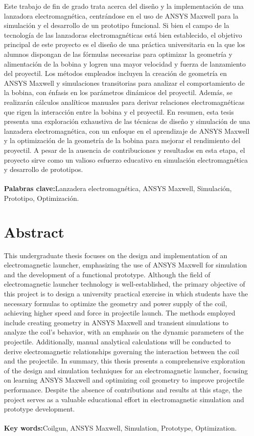\documentclass[a4paper,12pt]{article}
\begin{document}
Este trabajo de fin de grado trata acerca del diseño y la implementación de una lanzadora electromagnética, centrándose en el uso de ANSYS Maxwell para la simulación y el desarrollo de un prototipo funcional. Si bien el campo de la tecnología de las lanzadoras electromagnéticas está bien establecido, el objetivo principal de este proyecto es el diseño de una práctica universitaria en la que los alumnos dispongan de las fórmulas necesarias para optimizar la geometría y alimentación de la bobina y logren una mayor velocidad y fuerza de lanzamiento del proyectil. Los métodos empleados incluyen la creación de geometría en ANSYS Maxwell y simulaciones transitorias para analizar el comportamiento de la bobina, con énfasis en los parámetros dinámicos del proyectil. Además, se realizarán cálculos analíticos manuales para derivar relaciones electromagnéticas que rigen la interacción entre la bobina y el proyectil. En resumen, esta tesis presenta una exploración exhaustiva de las técnicas de diseño y simulación de una lanzadera electromagnética, con un enfoque en el aprendizaje de ANSYS Maxwell y la optimización de la geometría de la bobina para mejorar el rendimiento del proyectil. A pesar de la ausencia de contribuciones y resultados en esta etapa, el proyecto sirve como un valioso esfuerzo educativo en simulación electromagnética y desarrollo de prototipos.
\\~\\
\textbf{Palabras clave:}Lanzadera electromagnética, ANSYS Maxwell, Simulación, Prototipo, Optimización.

\newpage
\thispagestyle{plain}
\section{Abstract}
This undergraduate thesis focuses on the design and implementation of an electromagnetic launcher, emphasizing the use of ANSYS Maxwell for simulation and the development of a functional prototype. Although the field of electromagnetic launcher technology is well-established, the primary objective of this project is to design a university practical exercise in which students have the necessary formulas to optimize the geometry and power supply of the coil, achieving higher speed and force in projectile launch. The methods employed include creating geometry in ANSYS Maxwell and transient simulations to analyze the coil's behavior, with an emphasis on the dynamic parameters of the projectile. Additionally, manual analytical calculations will be conducted to derive electromagnetic relationships governing the interaction between the coil and the projectile. In summary, this thesis presents a comprehensive exploration of the design and simulation techniques for an electromagnetic launcher, focusing on learning ANSYS Maxwell and optimizing coil geometry to improve projectile performance. Despite the absence of contributions and results at this stage, the project serves as a valuable educational effort in electromagnetic simulation and prototype development.
\\~\\
\textbf{Key words:}Coilgun, ANSYS Maxwell, Simulation, Prototype, Optimization.
\end{document}
